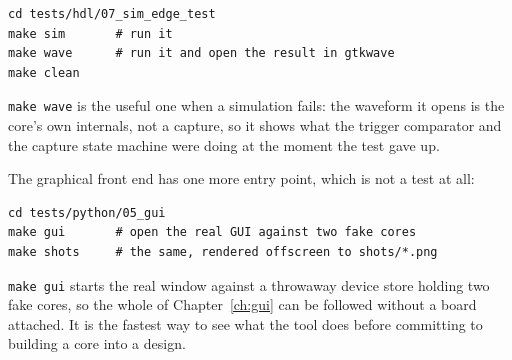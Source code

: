 \documentclass[../manual.tex]{subfiles}
\begin{document}
\begin{lstlisting}
cd tests/hdl/07_sim_edge_test
make sim       # run it
make wave      # run it and open the result in gtkwave
make clean
\end{lstlisting}

\texttt{make wave} is the useful one when a simulation fails: the waveform it opens is the core's own internals, not a capture, so it shows what the trigger comparator and the capture state machine were doing at the moment the test gave up.

The graphical front end has one more entry point, which is not a test at all:

\begin{lstlisting}
cd tests/python/05_gui
make gui       # open the real GUI against two fake cores
make shots     # the same, rendered offscreen to shots/*.png
\end{lstlisting}

\texttt{make gui} starts the real window against a throwaway device store holding two fake cores, so the whole of Chapter~\ref{ch:gui} can be followed without a board attached. It is the fastest way to see what the tool does before committing to building a core into a design.
\end{document}
